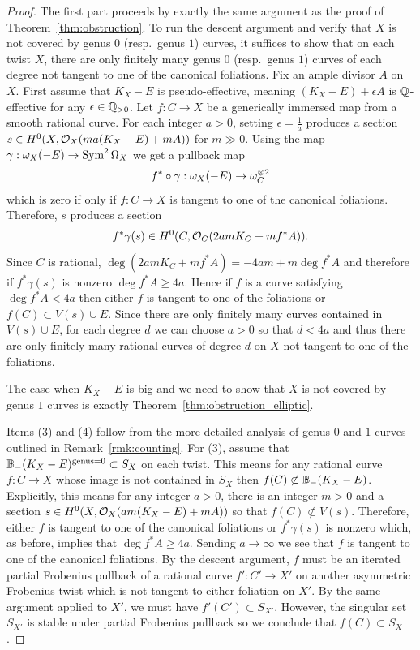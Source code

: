 \documentclass[main.tex]{subfiles}
\begin{document}
\begin{proof}
The first part proceeds by exactly the same argument as the proof of Theorem~\ref{thm:obstruction}. To run the descent argument and verify that $X$ is not covered by genus $0$ (resp.\ genus $1$) curves, it suffices to show that on each twist $X$, there are only finitely many genus $0$ (resp.\ genus $1$) curves of each degree not tangent to one of the canonical foliations. Fix an ample divisor $A$ on $X$. First assume that $K_X - E$ is pseudo-effective, meaning $(K_X - E) + \epsilon A$ is $\mathbb{Q}$-effective for any $\epsilon \in \mathbb{Q}_{>0}$. Let $f : C \to X$ be a generically immersed map from a smooth rational curve. For each integer $a > 0$, setting $\epsilon = \frac{1}{a}$ produces a section $s \in H^0(X, \mathcal{O}_X(m a(K_X - E) + m A))$ for $m \gg 0$. Using the map $\gamma : \omega_X(-E) \to \operatorname{\mathrm{Sym}}^{2} \Omega_X$ we get a pullback map
\[ f^* \circ \gamma : \omega_X(-E) \to \omega_{C}^{\otimes 2} \]
which is zero if only if $f : C \to X$ is tangent to one of the canonical foliations. Therefore, $s$ produces a section
\[ f^* \gamma(s) \in H^0(C, \mathcal{O}_C(2 am K_C + m f^* A)). \]
Since $C$ is rational, $\deg{(2 am K_C + m f^* A)} = -4am + m \deg{f^* A}$ and therefore if $f^* \gamma(s)$ is nonzero $\deg{f^* A} \ge 4a$. Hence if $f$ is a curve satisfying $\deg{f^* A} < 4a$ then either $f$ is tangent to one of the foliations or $f(C) \subset V(s) \cup E$. Since there are only finitely many curves contained in $V(s) \cup E$, for each degree $d$ we can choose $a > 0$ so that $d < 4a$ and thus there are only finitely many rational curves of degree $d$ on $X$ not tangent to one of the foliations. 
\par 
The case when $K_X - E$ is big and we need to show that $X$ is not covered by genus $1$ curves is exactly Theorem~\ref{thm:obstruction_elliptic}. 
\par 
Items (3) and (4) follow from the more detailed analysis of genus $0$ and $1$ curves outlined in Remark~\ref{rmk:counting}. For (3), assume that $\mathbb{B}_{-}(K_X - E)^{\mathrm{genus} = 0} \subset S_X$ on each twist. This means for any rational curve $f : C \to X$ whose image is not contained in $S_X$ then $f(C) \not\subset \mathbb{B}_{-}(K_X - E)$. Explicitly, this means for any integer $a > 0$, there is an integer $m > 0$ and a section $s \in H^0(X, \mathcal{O}_X(am(K_X - E) + m A))$ so that $f(C) \not\subset V(s)$. Therefore, either $f$ is tangent to one of the canonical foliations or $f^* \gamma(s)$ is nonzero which, as before, implies that $\deg{f^* A} \ge 4a$. Sending $a \to \infty$ we see that $f$ is tangent to one of the canonical foliations. By the descent argument, $f$ must be an iterated partial Frobenius pullback of a rational curve $f' : C' \to X'$ on another asymmetric Frobenius twist which is not tangent to either foliation on $X'$. By the same argument applied to $X'$, we must have $f'(C') \subset S_{X'}$. However, the singular set $S_{X'}$ is stable under partial Frobenius pullback so we conclude that $f(C) \subset S_{X}$.

\end{proof}
\end{document}
